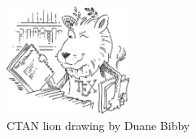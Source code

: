 \documentclass{article}
\begin{document}
\blindtext
\begin{figure}[ht]
  \centering
  \includegraphics[width=4cm]{../../img/lion}
  \caption{CTAN lion drawing by Duane Bibby}
  \label{img:lion}
\end{figure}
\blindtext
\end{document}

